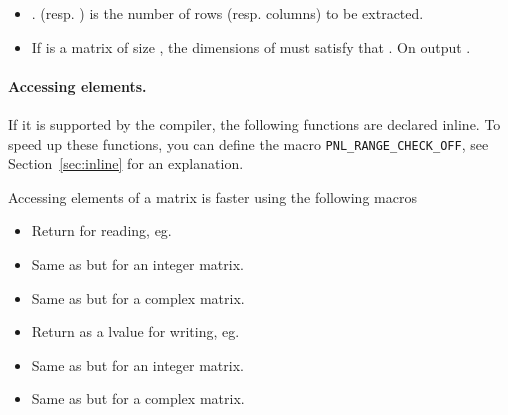 \begin{itemize}
\item {}
  \sshortdescribe {}. 
  (resp. ) is the number of rows (resp. columns) to be extracted.
  
\item {}
    \sshortdescribe If  is a matrix of size ,
    the dimensions of  must satisfy that 
    . On output . 
\end{itemize}  


\paragraph{Accessing elements.}

If it is supported by the compiler, the following functions are declared
inline. To speed up these functions, you can define the macro 
\texttt{PNL_RANGE_CHECK_OFF}, see Section~\ref{sec:inline} for an explanation. 

Accessing elements of a matrix is faster using the following macros
\begin{itemize}
  \item {}
  \sshortdescribe Return  for reading, eg. 
\item {}
  \sshortdescribe Same as  but for an integer matrix.
\item {}
  \sshortdescribe Same as  but for a complex matrix.
\item {}
  \sshortdescribe Return  as a lvalue for writing, eg.
\item {}
  \sshortdescribe Same as  but for an integer matrix.
\item {}
  \sshortdescribe Same as  but for a complex matrix.
\end{itemize}

